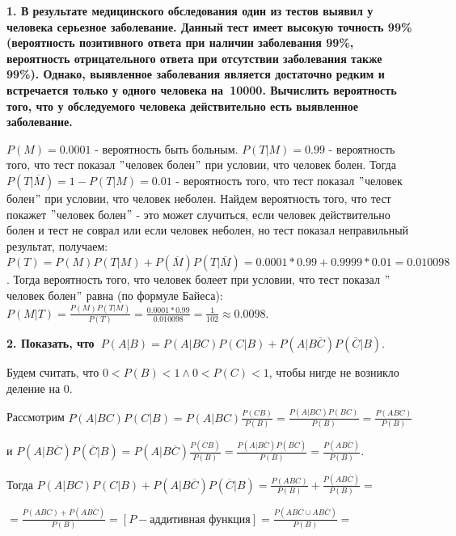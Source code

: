 \documentclass{article}
\begin{document}
\noindent \textbf{1. В результате медицинского обследования один из тестов выявил у человека серьезное заболевание. Данный тест имеет высокую точность 99\% (вероятность позитивного ответа при наличии заболевания 99\%, вероятность отрицательного ответа при отсутствии заболевания также 99\%). Однако, выявленное заболевания является достаточно редким и встречается только у одного человека на 10000. Вычислить вероятность того, что у обследуемого человека действительно есть выявленное заболевание.}

$P(M) = 0.0001$ - вероятность быть больным. $P(T|M) = 0.99$ -  вероятность того, что тест показал $"$человек болен$"$ при условии, что человек болен. Тогда $P(T|\overline M) = 1 - P(T|M) = 0.01$ - вероятность того, что тест показал $"$человек болен$"$ при условии, что человек неболен. Найдем вероятность того, что тест покажет $"$человек болен$"$ - это может случиться, если человек действительно болен и тест не соврал или если человек неболен, но тест показал неправильный результат, получаем: $P(T) = P(M)P(T|M)+P(\overline M)P(T|\overline M) = 0.0001 * 0.99 + 0.9999 * 0.01 = 0.010098$. Тогда вероятность того, что человек болеет при условии, что тест показал $"$человек болен$"$ равна (по формуле Байеса): $P(M|T) = \frac{P(M)P(T|M)}{P(T)} = \frac{0.0001*0.99}{0.010098} = \frac{1}{102} \approx 0.0098$.

\vspace{2mm}

\noindent \textbf{2. Показать, что $P(A|B)=P(A|BC)P(C|B)+P(A|B\overline C)P(\overline C|B).$}

\vspace{3mm}

Будем считать, что $0 < P(B) < 1 \land 0 < P(C) < 1$, чтобы нигде не возникло деление на 0.

Рассмотрим $P(A|BC)P(C|B) = P(A|BC)\frac{P(CB)}{P(B)} = \frac{P(A|BC)P(BC)}{P(B)} = \frac{P(ABC)}{P(B)}$
\vspace{1mm}

 и $P(A|B\overline C)P(\overline C|B) = P(A|B\overline C)\frac{P(\overline C B)}{P(B)} = \frac{P(A|B\overline C)P(B\overline C)}{P(B)} = \frac{P(AB\overline C)}{P(B)}$. 
\vspace{1mm}

Тогда $P(A|BC)P(C|B)+P(A|B\overline C)P(\overline C|B) = \frac{P(ABC)}{P(B)} + \frac{P(AB\overline C)}{P(B)} =$
\vspace{1mm}

$= \frac{P(ABC)+P(AB\overline C)}{P(B)} = [P - \text{аддитивная функция}] = \frac{P(ABC\cup AB\overline C)}{P(B)} =$
\end{document}
